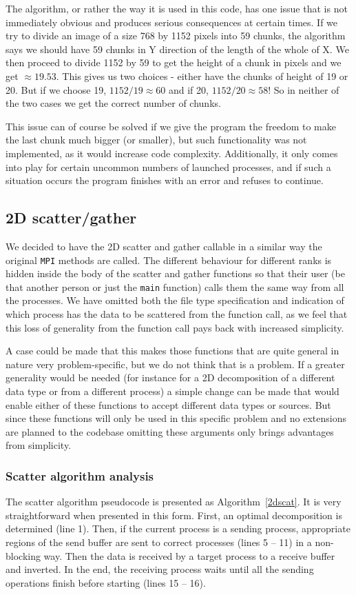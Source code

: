 \documentclass[11pt,a4paper]{article}
\begin{document}
The algorithm, or rather the way it is used in this code, has one issue that is not immediately obvious and produces serious consequences at certain times. If we try to divide an image of a size 768 by 1152 pixels into 59 chunks, the algorithm says we should have 59 chunks in Y direction of the length of the whole of X. We then proceed to divide 1152 by 59 to get the height of a chunk in pixels and we get $\approx 19.53$. This gives us two choices - either have the chunks of height of 19 or 20. But if we choose 19, $1152 / 19\approx 60$ and if 20, $1152 / 20\approx 58$! So in neither of the two cases we get the correct number of chunks.

This issue can of course be solved if we give the program the freedom to make the last chunk much bigger (or smaller), but such functionality was not implemented, as it would increase code complexity. Additionally, it only comes into play for certain uncommon numbers of launched processes, and if such a situation occurs the program finishes with an error and refuses to continue.

\subsection{2D scatter/gather}
\label{sec:2dscatgat}
We decided to have the 2D scatter and gather callable in a similar way the original \texttt{MPI} methods are called. The different behaviour for different ranks is hidden inside the body of the scatter and gather functions so that their user (be that another person or just the \texttt{main} function) calls them the same way from all the processes. We have omitted both the file type specification and indication of which process has the data to be scattered from the function call, as we feel that this loss of generality from the function call pays back with increased simplicity. 

A case could be made that this makes those functions that are quite general in nature very problem-specific, but we do not think that is a problem. If a greater generality would be needed (for instance for a 2D decomposition of a different data type or from a different process) a simple change can be made that would enable either of these functions to accept different data types or sources. But since these functions will only be used in this specific problem and no extensions are planned to the codebase omitting these arguments only brings advantages from simplicity.

\subsubsection{Scatter algorithm analysis}
The scatter algorithm pseudocode is presented as Algorithm~\ref{2dscat}. It is very straightforward when presented in this form. First, an optimal decomposition is determined (line 1). Then, if the current process is a sending process, appropriate regions of the send buffer are sent to correct processes (lines 5 -- 11) in a non-blocking way. Then the data is received by a target process to a receive buffer and inverted. In the end, the receiving process waits until all the sending operations finish before starting (lines 15 -- 16).
\end{document}
